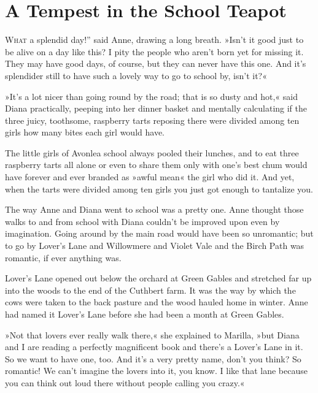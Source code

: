 \chapter{A Tempest in the School Teapot}

\lettrine[ante=“,lines=4]{W}{hat} a splendid day!” said Anne, drawing a long breath. »Isn't it good just to be alive on a day like this? I pity the people who aren't born yet for missing it. They may have good days, of course, but they can never have this one. And it's splendider still to have such a lovely way to go to school by, isn't it?«

»It's a lot nicer than going round by the road; that is so dusty and hot,« said Diana practically, peeping into her dinner basket and mentally calculating if the three juicy, toothsome, raspberry tarts reposing there were divided among ten girls how many bites each girl would have.

The little girls of Avonlea school always pooled their lunches, and to eat three raspberry tarts all alone or even to share them only with one's best chum would have forever and ever branded as »awful mean« the girl who did it. And yet, when the tarts were divided among ten girls you just got enough to tantalize you.

The way Anne and Diana went to school was a pretty one. Anne thought those walks to and from school with Diana couldn't be improved upon even by imagination. Going around by the main road would have been so unromantic; but to go by Lover's Lane and Willowmere and Violet Vale and the Birch Path was romantic, if ever anything was.

Lover's Lane opened out below the orchard at Green Gables and stretched far up into the woods to the end of the Cuthbert farm. It was the way by which the cows were taken to the back pasture and the wood hauled home in winter. Anne had named it Lover's Lane before she had been a month at Green Gables.

»Not that lovers ever really walk there,« she explained to Marilla, »but Diana and I are reading a perfectly magnificent book and there's a Lover's Lane in it. So we want to have one, too. And it's a very pretty name, don't you think? So romantic! We can't imagine the lovers into it, you know. I like that lane because you can think out loud there without people calling you crazy.«

